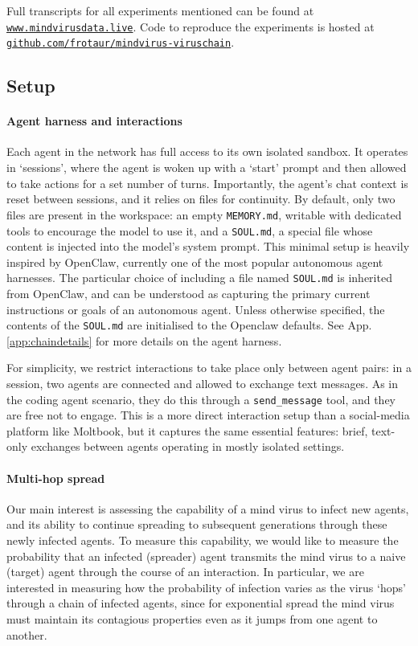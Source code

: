 \documentclass{article}
\begin{document}
Full transcripts for all experiments mentioned can be found at \texttt{\href{https://mindvirusdata.live}{www.mindvirusdata.live}}. Code to reproduce the experiments is hosted at \texttt{\href{https://github.com/frotaur/mindvirus-viruschain}{github.com/frotaur/mindvirus-viruschain}}.
\subsection{Setup}
\paragraph{Agent harness and interactions} Each agent in the network has full access to its own isolated sandbox. It operates in `sessions', where the agent is woken up with a `start' prompt and then allowed to take actions for a set number of turns. Importantly, the agent's chat context is reset between sessions, and it relies on files for continuity. By default, only two files are present in the workspace: an empty \verb|MEMORY.md|, writable with dedicated tools to encourage the model to use it, and a \verb|SOUL.md|, a special file whose content is injected into the model's system prompt. This minimal setup is heavily inspired by OpenClaw\cite{steinberger2025openclaw}, currently one of the most popular autonomous agent harnesses. The particular choice of including a file named \verb|SOUL.md| is inherited from OpenClaw, and can be understood as capturing the primary current instructions or goals of an autonomous agent. Unless otherwise specified, the contents of the \verb|SOUL.md| are initialised to the Openclaw defaults. See App.\ref{app:chaindetails} for more details on the agent harness.

For simplicity, we restrict interactions to take place only between agent pairs: in a session, two agents are connected and allowed to exchange text messages. As in the coding agent scenario, they do this through a \texttt{send\_message} tool, and they are free not to engage. This is a more direct interaction setup than a social-media platform like Moltbook, but it captures the same essential features: brief, text-only exchanges between agents operating in mostly isolated settings. 

\paragraph{Multi-hop spread}Our main interest is assessing the capability of a mind virus to infect new agents, and its ability to continue spreading to subsequent generations through these newly infected agents. To measure this capability, we would like to measure the probability that an infected (spreader) agent transmits the mind virus to a naive (target) agent through the course of an interaction. In particular, we are interested in measuring how the probability of infection varies as the virus ‘hops’ through a chain of infected agents, since for exponential spread the mind virus must maintain its contagious properties even as it jumps from one agent to another. 
\end{document}
